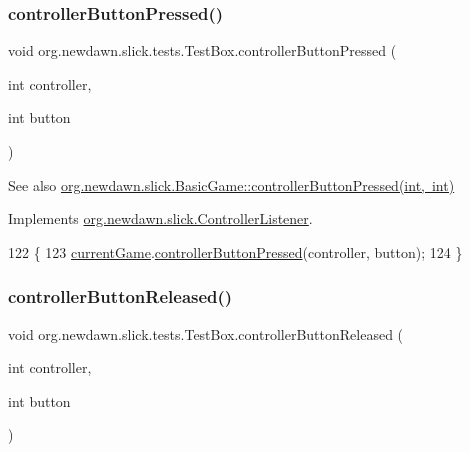 \subsubsection{\texorpdfstring{controller\+Button\+Pressed()}{controllerButtonPressed()}}
{\footnotesize\ttfamily void org.\+newdawn.\+slick.\+tests.\+Test\+Box.\+controller\+Button\+Pressed (\begin{DoxyParamCaption}\item[{int}]{controller,  }\item[{int}]{button }\end{DoxyParamCaption})\hspace{0.3cm}{\ttfamily [inline]}}

\begin{DoxySeeAlso}{See also}
\mbox{\hyperlink{classorg_1_1newdawn_1_1slick_1_1_basic_game_a9d83c85e4046945a3459debf55079697}{org.\+newdawn.\+slick.\+Basic\+Game\+::controller\+Button\+Pressed(int, int)}} 
\end{DoxySeeAlso}


Implements \mbox{\hyperlink{interfaceorg_1_1newdawn_1_1slick_1_1_controller_listener_ae6feac165a8d0eded01f38de12f239ff}{org.\+newdawn.\+slick.\+Controller\+Listener}}.


\begin{DoxyCode}
122                                                                     \{
123         \mbox{\hyperlink{classorg_1_1newdawn_1_1slick_1_1tests_1_1_test_box_a5e0fdb2f97173d828af597044c525078}{currentGame}}.\mbox{\hyperlink{classorg_1_1newdawn_1_1slick_1_1_basic_game_a9d83c85e4046945a3459debf55079697}{controllerButtonPressed}}(controller, button);
124     \}
\end{DoxyCode}
\mbox{\label{classorg_1_1newdawn_1_1slick_1_1tests_1_1_test_box_a86db5c38f8964e3e401bc42b60562a42}} 
\subsubsection{\texorpdfstring{controller\+Button\+Released()}{controllerButtonReleased()}}
{\footnotesize\ttfamily void org.\+newdawn.\+slick.\+tests.\+Test\+Box.\+controller\+Button\+Released (\begin{DoxyParamCaption}\item[{int}]{controller,  }\item[{int}]{button }\end{DoxyParamCaption})\hspace{0.3cm}{\ttfamily [inline]}}

